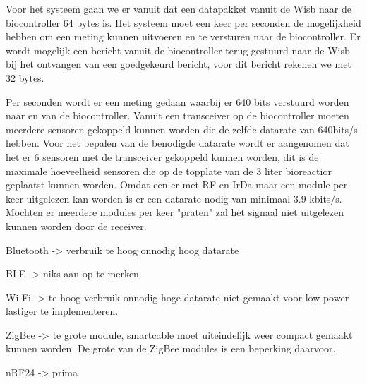 Voor het systeem gaan we er vanuit dat een datapakket vanuit de Wisb naar de biocontroller 64 bytes is. Het systeem moet een keer per seconden de mogelijkheid hebben om een meting kunnen uitvoeren en te versturen naar de biocontroller. Er wordt mogelijk een bericht vanuit de biocontroller terug gestuurd naar de Wisb bij het ontvangen van een goedgekeurd bericht, voor dit bericht rekenen we met 32 bytes.

Per seconden wordt er een meting gedaan waarbij er 640 bits verstuurd worden naar en van de biocontroller. Vanuit een transceiver op de biocontroller moeten meerdere sensoren gekoppeld kunnen worden die de zelfde datarate van 640bits/s hebben. Voor het bepalen van de benodigde datarate wordt er aangenomen dat het er 6 sensoren met de transceiver gekoppeld kunnen worden, dit is de maximale hoeveelheid sensoren die op de topplate van de 3 liter bioreactior geplaatst kunnen worden. Omdat een er met RF en IrDa maar een module per keer uitgelezen kan worden is er een datarate nodig van minimaal 3.9 kbits/s. Mochten er meerdere modules per keer "praten" zal het signaal niet uitgelezen kunnen worden door de receiver.

\begin{table}[H]
	\centering
	\caption{Wireless module afwegingstabel}
	\label{tab:wisb_mod_wens}
\end{table}

Bluetooth -> verbruik te hoog onnodig hoog datarate

BLE -> niks aan op te merken

Wi-Fi -> te hoog verbruik onnodig hoge datarate niet gemaakt voor low power lastiger te implementeren.

ZigBee -> te grote module, smartcable moet uiteindelijk weer compact gemaakt kunnen worden. De grote van de ZigBee modules is een beperking daarvoor. 

nRF24 -> prima


